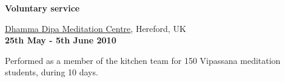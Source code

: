 \halfblankline

\textbf{Voluntary service}
\begin{outerlist}

\item[] \href{http://www.dipa.dhamma.org/}{Dhamma Dipa Meditation Centre},
Hereford, UK%
        \\ \textbf{25th May - 5th June 2010}
\begin{innerlist}
\item Performed as a member of the kitchen team for 150 Vipassana meditation
students, during 10 days.
\end{innerlist}
\end{outerlist}

% 

% 
% 
% 


